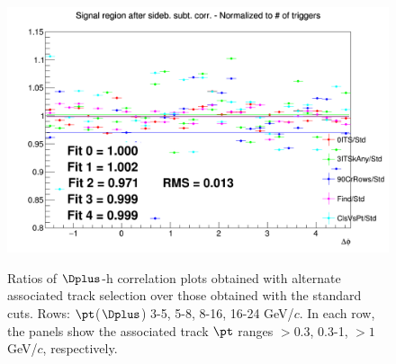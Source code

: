 \begin{figure}
{\includegraphics[width=0.31\linewidth]{Centrality_DPlus/Dplus/Systematic/0_20/Tracks_0_20/Ratio_AzimCorrDistr_Dplus_Canvas_PtIntBins11to11_PoolInt_thr1dotto99dot.png}} \\
 \caption{Ratios of $\Dplus$-h correlation plots obtained with alternate associated track selection over those obtained with the standard cuts. Rows: $\pt$($\Dplus$) 3-5, 5-8, 8-16, 16-24 GeV/$c$. In each row, the panels show the associated track
$\pt$ ranges $> 0.3$, 0.3-1, $> 1$ GeV/$c$, respectively.}
\label{fig:SysTrEff020_Dplus}
\end{figure}

